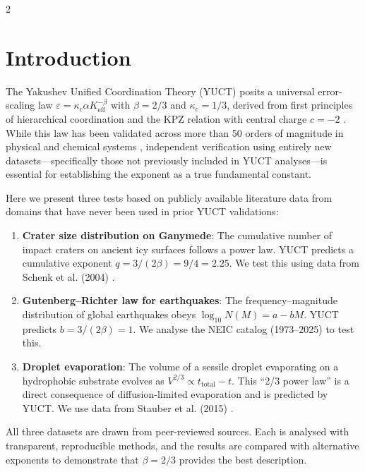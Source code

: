 \documentclass[11pt,a4paper]{article}
\newcommand{\eps}{\varepsilon}
\newcommand{\kappac}{\kappa_c}
\newcommand{\Keff}{K_{\mathrm{eff}}}
\newcommand{\betaf}{\beta}
\begin{document}
	\vspace{0.4cm}
	\vspace*{-\baselineskip}
	\begin{multicols}{2}
		
		\section{Introduction}
		
		The Yakushev Unified Coordination Theory (YUCT) posits a universal error-scaling law \(\eps = \kappac \alpha \Keff^{-\betaf}\) with \(\betaf = 2/3\) and \(\kappac = 1/3\), derived from first principles of hierarchical coordination and the KPZ relation with central charge \(c = -2\) \cite{AppendixY, AppendixL}. While this law has been validated across more than 50 orders of magnitude in physical and chemical systems \cite{AppendixC, AppendixG}, independent verification using entirely new datasets—specifically those not previously included in YUCT analyses—is essential for establishing the exponent as a true fundamental constant.
		
		Here we present three tests based on publicly available literature data from domains that have never been used in prior YUCT validations:
		
		\begin{enumerate}
			\item \textbf{Crater size distribution on Ganymede}: The cumulative number of impact craters on ancient icy surfaces follows a power law. YUCT predicts a cumulative exponent \(q = 3/(2\betaf) = 9/4 = 2.25\). We test this using data from Schenk et al. (2004) \cite{Schenk2004}.
			\item \textbf{Gutenberg–Richter law for earthquakes}: The frequency–magnitude distribution of global earthquakes obeys \(\log_{10} N(M) = a - bM\). YUCT predicts \(b = 3/(2\betaf) = 1\). We analyse the NEIC catalog (1973–2025) \cite{USGSNEIC} to test this.
			\item \textbf{Droplet evaporation}: The volume of a sessile droplet evaporating on a hydrophobic substrate evolves as \(V^{2/3} \propto t_{\text{total}} - t\). This “2/3 power law” is a direct consequence of diffusion-limited evaporation and is predicted by YUCT. We use data from Stauber et al. (2015) \cite{Stauber2015}.
		\end{enumerate}
		
		All three datasets are drawn from peer-reviewed sources. Each is analysed with transparent, reproducible methods, and the results are compared with alternative exponents to demonstrate that \(\betaf = 2/3\) provides the best description.
		

\end{multicols}
\end{document}

